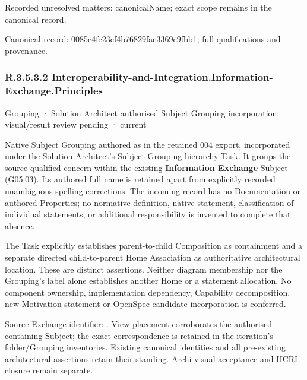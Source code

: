 {\small Recorded unresolved matters: canonicalName; exact scope remains in the canonical record.}\par
{\footnotesize \href{../../../../continuum/grouping/0085c4fe23cf4b76829fae3369c9fbb1.md}{Canonical record: 0085c4fe23cf4b76829fae3369c9fbb1}; full qualifications and provenance.}\par
\subsubsection*{R.3.5.3.2 Interoperability-and-Integration.Information-Exchange.Principles}
\label{navigation:R.3.5.3.2}

\label{element:08ffff9f57aa412b80e36ab154136ad0}
{\small Grouping · Solution Architect authorised Subject Grouping incorporation; visual/result review pending · current}\par

Native Subject Grouping authored as \texttt{} in the retained 004 export,
incorporated under the Solution Architect's Subject Grouping hierarchy Task.
It groups the source-qualified \texttt{} concern within
the existing \textbf{Information Exchange} Subject (G05.03). Its authored full name
is retained apart from explicitly recorded unambiguous spelling corrections.
The incoming record has no Documentation or authored Properties; no normative
definition, native statement, classification of individual statements, or
additional responsibility is invented to complete that absence.



The Task explicitly establishes parent-to-child Composition as containment and
a separate directed child-to-parent Home Association as authoritative architectural
location. These are distinct assertions. Neither diagram membership nor the
Grouping's label alone establishes another Home or a statement allocation.
No component ownership, implementation dependency, Capability decomposition,
new Motivation statement or OpenSpec candidate incorporation is conferred.



Source Exchange identifier: \texttt{}. View placement corroborates
the authorised containing Subject; the exact correspondence is retained in the
iteration's folder/Grouping inventories. Existing canonical identities and all
pre-existing architectural assertions retain their standing. Archi visual
acceptance and HCRL closure remain separate.


